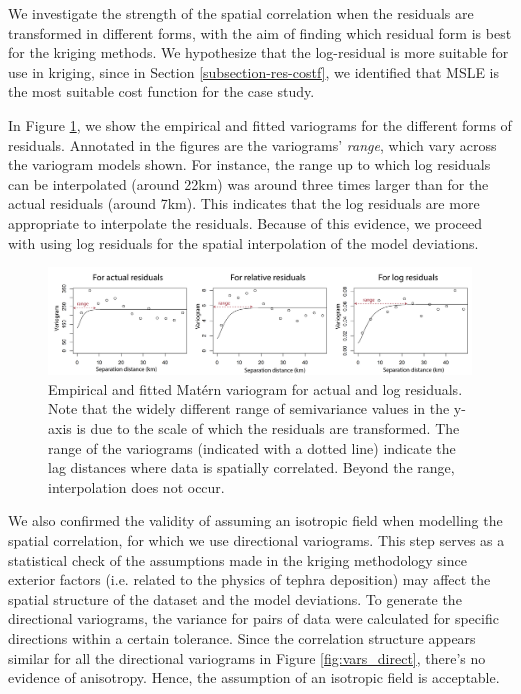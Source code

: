     We investigate the strength of the spatial correlation when the residuals are transformed in different forms, with the aim of finding which residual form is best for the kriging methods. We hypothesize that the log-residual is more suitable for use in kriging, since in Section \ref{subsection-res-costf}, we identified that MSLE is the most suitable cost function for the case study. 

    In Figure \ref{fig:vars_three}, we show the empirical and fitted variograms for the different forms of residuals. Annotated in the figures are the variograms' \textit{range}, which vary across the variogram models shown. For instance, the range up to which log residuals can be interpolated (around 22km) was around three times larger than for the actual residuals (around 7km). This indicates that the log residuals are more appropriate to interpolate the residuals. Because of this evidence, we proceed with using log residuals for the spatial interpolation of the model deviations. 

    \begin{figure}[htbp!]
    \centering
    \includegraphics[width=\linewidth]{Figures/fig11_variograms-types.png}
    \caption{Empirical and fitted Mat\'ern variogram for actual and log residuals. Note that the widely different range of semivariance values in the y-axis is due to the scale of which the residuals are transformed. The range of the variograms (indicated with a dotted line) indicate the lag distances where data is spatially correlated. Beyond the range, interpolation does not occur.}
    \label{fig:vars_three}
    \end{figure}
    
    We also confirmed the validity of assuming an isotropic field when modelling the spatial correlation, for which we use directional variograms. This step serves as a statistical check of the assumptions made in the kriging methodology since exterior factors (i.e. related to the physics of tephra deposition) may affect the spatial structure of the dataset and the model deviations. To generate the directional variograms, the variance for pairs of data were calculated for specific directions within a certain tolerance. Since the correlation structure appears similar for all the directional variograms in Figure \ref{fig:vars_direct}, there's no evidence of anisotropy. Hence, the assumption of an isotropic field is acceptable.
    
